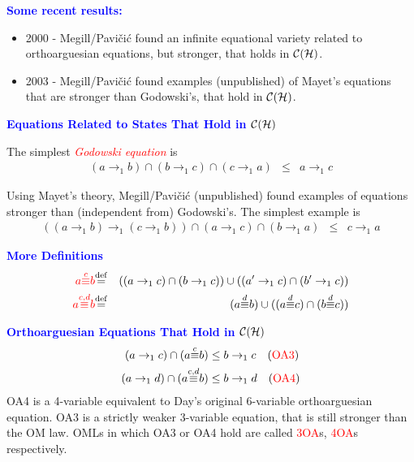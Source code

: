 \documentclass{slides}
\begin{document}
\begin{slide}

\textcolor{blue}{\textbf{Some recent results:}}

\begin{itemize}
\item 2000 - Megill/Pavi\v ci\'c found an infinite equational variety
related to orthoarguesian equations, but stronger, that
holds in ${\cal C}({\cal H})$.
\item 2003 - Megill/Pavi\v ci\'c found examples (unpublished)
 of Mayet's equations
that are stronger than Godowski's, that
hold in ${\cal C}({\cal H})$.
\end{itemize}


\end{slide}

\begin{slide}
\textcolor{blue}{\textbf{Equations Related to States
That Hold in ${\cal C}({\cal H})$}}

The simplest \textcolor{red}{\em Godowski equation} is
\begin{eqnarray}
(a\to_1 b)\cap(b\to_1 c)\cap(c\to_1 a) &\le& a\to_1 c
\end{eqnarray}

Using Mayet's theory, Megill/Pavi\v ci\'c (unpublished) found examples
of equations stronger than (independent from) Godowski's.  The
simplest example is
\begin{eqnarray}
( ( a \to_1 b ) \to_1 ( c \to_1 b ) ) \cap
                     ( a \to_1 c ) \cap ( b \to_1 a )& \le&  c \to_1 a
\end{eqnarray}
\end{slide}

\begin{slide}
\textcolor{blue}{\textbf{More Definitions}}
\begin{eqnarray}
\textcolor{red}{a{\buildrel c\over\equiv}b}
&{\buildrel\rm def\over =}& ((a\to_1 c)
\cap(b\to_1 c))
\cup((a'\to_1 c)\cap(b'\to_1 c)) \\
\textcolor{red}{a{\buildrel c,d\over\equiv}b}
&{\buildrel\rm def\over =}& (a{\buildrel d\over\equiv}b)\cup
((a{\buildrel d\over\equiv}c)\cap
(b{\buildrel d\over\equiv}c))
\end{eqnarray}

\textcolor{blue}{\textbf{Orthoarguesian Equations
That Hold in ${\cal C}({\cal H})$}}
\begin{eqnarray}
(a\to_1 c)\cap (a{\buildrel c\over\equiv}b) & \le  b\to_1 c
\quad\mbox{(\textcolor{red}{OA3})} \\
(a\to_1 d)\cap (a{\buildrel c,d\over\equiv}b) & \le  b\to_1 d
\quad\mbox{(\textcolor{red}{OA4})}
\end{eqnarray}
OA4 is a 4-variable equivalent to Day's original 6-variable orthoarguesian
equation.  OA3 is a strictly weaker 3-variable
equation, that is still stronger than the OM law.  OMLs in which
OA3 or OA4 hold are called \textcolor{red}{3OA}s,
\textcolor{red}{4OA}s respectively.

\end{slide}
\end{document}
